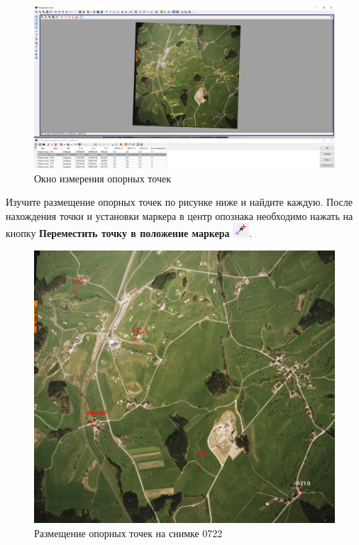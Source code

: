 \documentclass[
  12pt,
]{book}
\begin{document}
\begin{figure}
\centering
\includegraphics{images/Ref15/Measure_Point2.png}
\caption{Окно измерения опорных точек}
\end{figure}

Изучите размещение опорных точек по рисунке ниже и найдите каждую. После нахождения точки и установки маркера в центр опознака необходимо нажать на кнопку \textbf{Переместить точку в положение маркера} \includegraphics{images/Ref15/Move_Point2Marker.png}.

\begin{figure}
\centering
\includegraphics{images/Ref15/Image_0722.png}
\caption{Размещение опорных точек на снимке 0722}
\end{figure}
\end{document}
